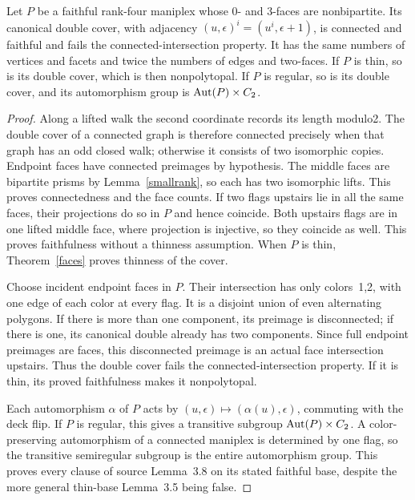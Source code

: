 \documentclass[a4paper,11pt]{article}
\begin{document}
\begin{corollary}\label{double}
Let $P$ be a faithful rank-four maniplex whose $0$- and $3$-faces are
nonbipartite. Its canonical double cover, with adjacency
$(u,\epsilon)^i=(u^i,\epsilon+1)$, is connected and faithful and fails
the connected-intersection property. It has the same numbers of vertices
and facets and twice the numbers of edges and two-faces. If $P$ is thin,
so is its double cover, which is then nonpolytopal. If $P$ is regular,
so is its double cover, and its automorphism group is $\operatorname{Aut}(P)\times C_2$.
\end{corollary}
\begin{proof}
Along a lifted walk the second coordinate records its length modulo2.
The double cover of a connected graph is therefore connected precisely
when that graph has an odd closed walk; otherwise it consists of two
isomorphic copies. Endpoint faces have connected preimages by hypothesis.
The middle faces are bipartite prisms by Lemma~\ref{smallrank}, so each
has two isomorphic lifts. This proves connectedness and the face counts.
If two flags upstairs lie in all the same faces, their projections do so
in $P$ and hence coincide. Both upstairs flags are in one lifted middle
face, where projection is injective, so they coincide as well. This proves
faithfulness without a thinness assumption. When $P$ is thin,
Theorem~\ref{faces} proves thinness of the cover.

Choose incident endpoint faces in $P$. Their intersection has only
colors~1,2, with one edge of each color at every flag. It is a disjoint
union of even alternating polygons. If there is more than one component,
its preimage is disconnected; if there is one, its canonical double
already has two components. Since full endpoint preimages are faces,
this disconnected preimage is an actual face intersection upstairs.
Thus the double cover fails the connected-intersection property. If it
is thin, its proved faithfulness makes it nonpolytopal.

Each automorphism $\alpha$ of $P$ acts by
$(u,\epsilon)\mapsto(\alpha(u),\epsilon)$, commuting with the deck flip.
If $P$ is regular, this gives a transitive subgroup $\operatorname{Aut}(P)\times C_2$.
A color-preserving automorphism of a connected maniplex is determined by
one flag, so the transitive semiregular subgroup is the entire automorphism
group. This proves every clause of source Lemma~3.8 on its stated faithful
base, despite the more general thin-base Lemma~3.5 being false.
\end{proof}
\end{document}
